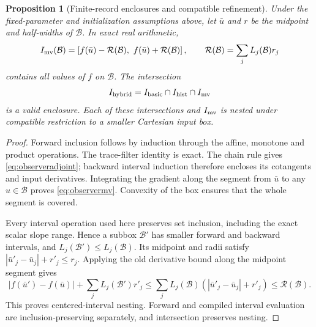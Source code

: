 \documentclass[11pt,a4paper]{article}
\newtheorem{proposition}[theorem]{Proposition}
\theoremstyle{definition}\newtheorem{definition}[theorem]{Definition}
\begin{document}
\begin{proposition}[Finite-record enclosures and compatible refinement]\label{prop:observerbox}
Under the fixed-parameter and initialization assumptions above, let $\bar u$ and $r$ be the midpoint and half-widths of $\mathcal B$. In exact real arithmetic,
\begin{equation}
 I_{\rm mv}(\mathcal B)=\left[f(\bar u)-\mathcal R(\mathcal B),\ f(\bar u)+\mathcal R(\mathcal B)\right],
 \qquad \mathcal R(\mathcal B)=\sum_jL_j(\mathcal B)r_j
 \label{eq:observermv}
\end{equation}
contains all values of $f$ on $\mathcal B$. The intersection
\[
 I_{\rm hybrid}=I_{\rm basic}\cap I_{\rm hist}\cap I_{\rm mv}
\]
is a valid enclosure. Each of these intersections and $I_{\rm mv}$ is nested under compatible restriction to a smaller Cartesian input box.
\end{proposition}
\begin{proof}
Forward inclusion follows by induction through the affine, monotone and product operations. The trace-filter identity is exact. The chain rule gives \eqref{eq:observeradjoint}; backward interval induction therefore encloses its cotangents and input derivatives. Integrating the gradient along the segment from $\bar u$ to any $u\in\mathcal B$ proves \eqref{eq:observermv}. Convexity of the box ensures that the whole segment is covered.

Every interval operation used here preserves set inclusion, including the exact scalar slope range. Hence a subbox $\mathcal B'$ has smaller forward and backward intervals, and $L_j(\mathcal B')\leq L_j(\mathcal B)$. Its midpoint and radii satisfy $|\bar u'_j-\bar u_j|+r'_j\leq r_j$. Applying the old derivative bound along the midpoint segment gives
\[
 |f(\bar u')-f(\bar u)|+\sum_jL_j(\mathcal B')r'_j
 \leq\sum_jL_j(\mathcal B)(|\bar u'_j-\bar u_j|+r'_j)
 \leq\mathcal R(\mathcal B).
\]
This proves centered-interval nesting. Forward and compiled interval evaluation are inclusion-preserving separately, and intersection preserves nesting.
\end{proof}
\end{document}
